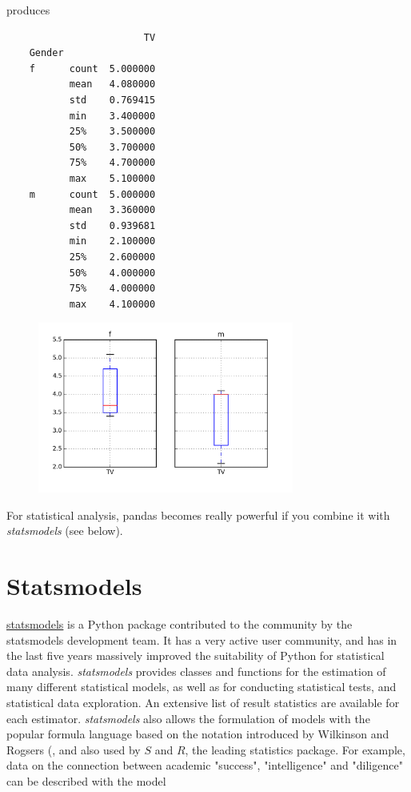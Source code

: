 produces

\begin{lstlisting}
                        TV
    Gender
    f      count  5.000000
           mean   4.080000
           std    0.769415
           min    3.400000
           25%    3.500000
           50%    3.700000
           75%    4.700000
           max    5.100000
    m      count  5.000000
           mean   3.360000
           std    0.939681
           min    2.100000
           25%    2.600000
           50%    4.000000
           75%    4.000000
           max    4.100000
\end{lstlisting}

\begin{figure}[H]
  \centering
  \includegraphics[width=0.75\textwidth]{../Images/grouped.png}\\
\end{figure}

For statistical analysis, pandas becomes really powerful if you combine it with \emph{statsmodels} (see below).

\section{Statsmodels}

\href{http://statsmodels.sourceforge.net/.}{statsmodels} is a Python package contributed to the community by the statsmodels development team. It has a very active user community, and has in the last five years massively improved the suitability of Python for statistical data analysis. \emph{statsmodels} provides classes and functions for the estimation of many different statistical models, as well as for conducting statistical tests, and statistical data exploration. An extensive list of result statistics are available for each estimator. \emph{statsmodels} also allows the formulation of models with the popular formula language based on the notation introduced by Wilkinson and Rogsers (\cite{Wilkinson1973}, and also used by $S$ and $R$, the leading statistics package. For example, data on the connection between academic "success", "intelligence" and "diligence" can be described with the model

